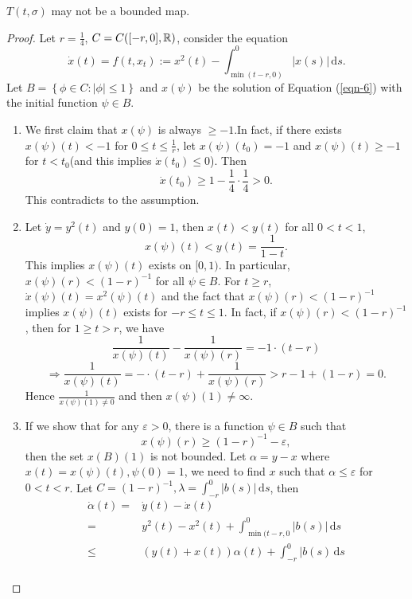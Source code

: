 \begin{proposition}
  $T(t,\sigma)$ may not be a bounded map.
\end{proposition}
\begin{proof}
Let $r=\frac{1}{4}$, $C=C([-r,0],\mathbb{R})$, consider the equation
\begin{equation}\label{eqn-6}
  \dot{x}(t)=f(t,x_t):=x^2(t)-\int_{\min(t-r,0)}^{0}|x(s)|\,\mathrm{d}s.
\end{equation}
Let $B=\left\{\phi \in C:|\phi|\le 1\right\} $ and $x(\psi)$ be the  solution of Equation (\ref{eqn-6}) with the initial function $\psi \in B$. 
\begin{enumerate}
\item We first claim that $x(\psi)$ is always $\ge -1$.In fact,
  if there exists $x(\psi)(t)<-1$ for $0\le t\le \frac{1}{r}$, let $x(\psi)(t_0)=-1$ and $x(\psi)(t)\ge-1$ for $t<t_0$(and this implies $\dot{x}(t_0)\le 0$). Then
 \[
   \dot{x}(t_0)\ge 1-\frac{1}{4}\cdot \frac{1}{4}>0.
\] 
This contradicts to the assumption.
\item Let $\dot{y}=y^2(t)$ and $y(0)=1$, then $x(t)<y(t)$ for all $0<t<1$,
  \[
    x(\psi)(t)<y(t)=\frac{1}{1-t}.
  \] 
  This implies $x(\psi)(t)$ exists on $[0,1)$.
  In particular, $x(\psi)(r)<(1-r)^{-1}$ for all $\psi \in B$. For $t\ge r$, $\dot{x}(\psi)(t)=x^2(\psi)(t)$ and the fact that $x(\psi)(r)<(1-r)^{-1}$ implies $x(\psi)(t)$ exists for $-r\le t\le 1$. In fact, if $x(\psi)(r)<(1-r)^{-1}$, then for $1\ge t>r$, we have
   \[
     \frac{1}{x(\psi)(t)}-\frac{1}{x(\psi)(r)}=-1\cdot \left( t-r \right) 
  \] 
  \[
    \Rightarrow \frac{1}{x(\psi)(t)}=-\cdot (t-r)+\frac{1}{x(\psi)(r)}>r-1+(1-r)=0.
  \] 
  Hence $\frac{1}{x(\psi)(1)\neq 0}$ and then $x(\psi)(1)\neq \infty$.
\item If we show that for any $\varepsilon >0$, there is a function  $\psi \in B$ such that 
  \[
    x(\psi)(r)\ge (1-r)^{-1}-\varepsilon ,
  \] 
  then the set  $x(B)(1)$ is not bounded. Let $\alpha=y-x$ where $x(t)=x(\psi)(t),\psi(0)=1$, we need to find $x$ such that $\alpha\le \varepsilon $ for $0<t<r$. Let $C=(1-r)^{-1},\lambda=\int_{-r}^{0}|b(s)|\,\mathrm{d}s$, then 
  \begin{equation*}
    \begin{aligned}
      \dot{\alpha}(t)= & \dot{y}(t)-\dot{x}(t)\\
      = & y^2(t)-x^2(t)+\int_{\min(t-r,0}^{0}|b(s)|\,\mathrm{d}s\\
      \le & \left( y(t)+x(t) \right) \alpha(t)+\int_{-r}^{0}|b(s)\,\mathrm{d}s\\

\end{aligned}
\end{equation*}
\end{enumerate}
\end{proof}
